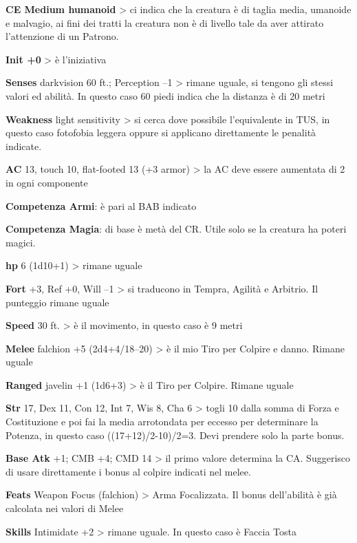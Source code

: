 \documentclass[a4paper,11pt,twoside,openany]{book}
\begin{document}
{\textbf{CE Medium humanoid} \textgreater{} ci indica che la creatura è di taglia media, umanoide e malvagio, ai fini dei tratti la creatura non è di livello tale da aver attirato l'attenzione di un Patrono.

\textbf{Init +0} \textgreater{} è l'iniziativa

\textbf{Senses} darkvision 60 ft.; Perception --1 \textgreater{} rimane uguale, si tengono gli stessi valori ed abilità. In questo caso 60 piedi indica che la distanza è di 20 metri

\textbf{Weakness} light sensitivity \textgreater{} si cerca dove possibile l'equivalente in TUS, in questo caso fotofobia leggera oppure si applicano direttamente le penalità indicate.

\textbf{AC} 13, touch 10, flat-footed 13 (+3 armor) \textgreater{} la AC deve essere aumentata di 2 in ogni componente

\textbf{Competenza Armi}: è pari al BAB indicato

\textbf{Competenza Magia}: di base è metà del CR. Utile solo se la creatura ha poteri magici.

\textbf{hp} 6 (1d10+1) \textgreater{} rimane uguale

\textbf{Fort} +3, Ref +0, Will --1 \textgreater{} si traducono in Tempra, Agilità e Arbitrio. Il punteggio rimane uguale

\textbf{Speed} 30 ft. \textgreater{} è il movimento, in questo
caso è 9 metri

\textbf{Melee} falchion +5 (2d4+4/18--20) \textgreater{} è il mio Tiro per Colpire e danno. Rimane uguale

\textbf{Ranged} javelin +1 (1d6+3) \textgreater{} è il Tiro per Colpire. Rimane uguale

\textbf{Str} 17, Dex 11, Con 12, Int 7, Wis 8, Cha 6 \textgreater{} togli 10 dalla somma di Forza e Costituzione e poi fai la media arrotondata per eccesso per determinare la Potenza, in questo caso ((17+12)/2-10)/2=3. Devi prendere solo la parte bonus.

\textbf{Base Atk} +1; CMB +4; CMD 14 \textgreater{} il primo valore determina la CA. Suggerisco di usare direttamente i bonus al colpire indicati nel melee. 

\textbf{Feats} Weapon Focus (falchion) \textgreater{} Arma Focalizzata. Il bonus dell'abilità è già calcolata nei valori di Melee

\textbf{Skills} Intimidate +2 \textgreater{} rimane uguale. In questo caso è Faccia Tosta

}
\end{document}

